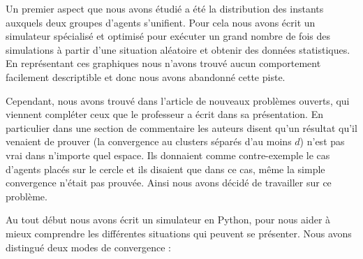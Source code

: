 \documentclass[a4paper,10pt]{article}
\begin{document}
Un premier aspect que nous avons étudié a été la distribution des instants auxquels deux groupes d'agents s'unifient. Pour cela nous avons écrit un simulateur spécialisé et optimisé pour exécuter un grand nombre de fois des simulations à partir d'une situation aléatoire et obtenir des données statistiques. En représentant ces graphiques nous n'avons trouvé aucun comportement facilement descriptible et donc nous avons abandonné cette piste.

Cependant, nous avons trouvé dans l'article de nouveaux problèmes ouverts, qui viennent compléter ceux que le professeur a écrit dans sa présentation. En particulier dans une section de commentaire les auteurs disent qu'un résultat qu'il venaient de prouver (la convergence au clusters séparés d'au moins $d$) n'est pas vrai dans n'importe quel espace. Ils donnaient comme contre-exemple le cas d'agents placés sur le cercle et ils disaient que dans ce cas, même la simple convergence n’était pas prouvée. Ainsi nous avons décidé de travailler sur ce problème.

Au tout début nous avons écrit un simulateur en Python, pour nous aider à mieux comprendre les différentes situations qui peuvent se présenter. Nous avons distingué deux modes de convergence :
\end{document}
